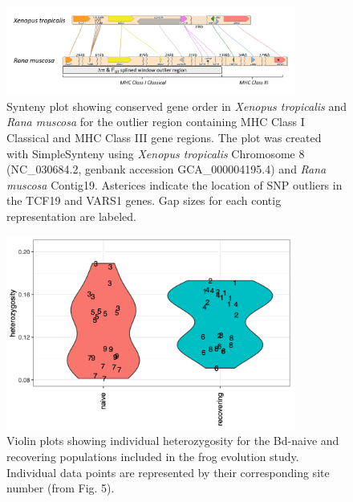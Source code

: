 \documentclass[9pt,twoside,lineno]{pnas-new}
\begin{document}
\begin{figure}

{\centering \includegraphics[width=0.85\textwidth]{figures/synteny_figure.png}

}

\caption{\label{fig-synteny-plot}Synteny plot showing conserved gene
order in \emph{Xenopus tropicalis} and \emph{Rana muscosa} for the
outlier region containing MHC Class I Classical and MHC Class III gene
regions. The plot was created with SimpleSynteny \citep{veltri2016}
using \emph{Xenopus tropicalis} Chromosome 8 (NC\_030684.2, genbank
accession GCA\_000004195.4) and \emph{Rana muscosa} Contig19. Asterices
indicate the location of SNP outliers in the TCF19 and VARS1 genes. Gap
sizes for each contig representation are labeled.}

\end{figure}\clearpage

\newpage

\begin{figure}

{\centering \includegraphics[width=0.85\textwidth]{figures/violin_plot_heterozy_by_group.png}

}

\caption{\label{fig-violinplot-heterozy}Violin plots showing individual
heterozygosity for the Bd-naive and recovering populations included in
the frog evolution study. Individual data points are represented by
their corresponding site number (from
Fig. 5).}

\end{figure}\clearpage
\end{document}
